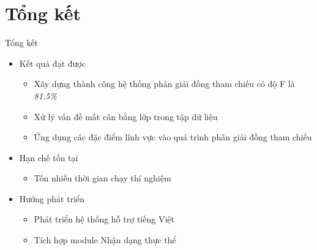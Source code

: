 \section{Tổng kết}
\begin{frame}{Tổng kết}
\putlogo
\begin{itemize}
\item Kết quả đạt được
\begin{itemize}
	\item Xây dựng thành công hệ thống phân giải đồng tham chiếu có độ F là \emph{81.5\%}
	\item Xử lý vấn đề mất cân bằng lớp trong tập dữ liệu
	\item Ứng dụng các đặc điểm lĩnh vực vào quá trình phân giải đồng tham chiếu
\end{itemize}
\item Hạn chế tồn tại
\begin{itemize}
	\item Tốn nhiều thời gian chạy thí nghiệm
\end{itemize}
\item Hướng phát triển
\begin{itemize}
	\item Phát triển hệ thống hỗ trợ tiếng Việt
	\item Tích hợp module Nhận dạng thực thể
\end{itemize}
\end{itemize}
\end{frame}

